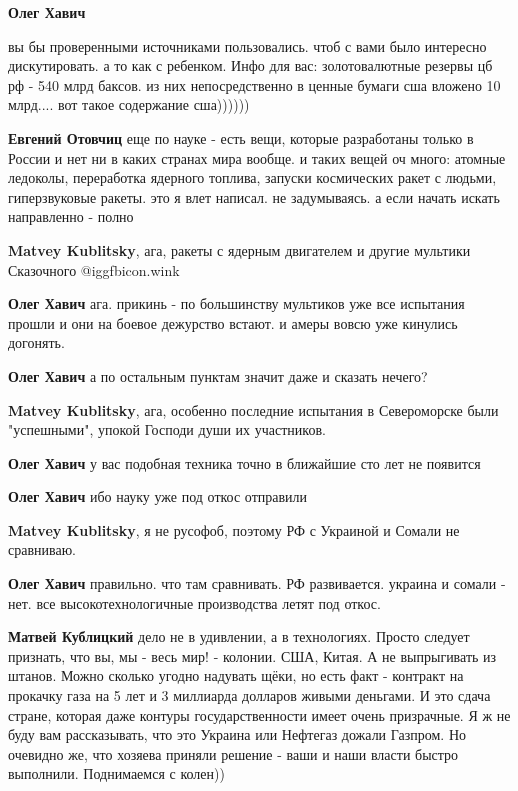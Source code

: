 \begin{itemize}
\begin{itemize}
\textbf{Олег Хавич} 

вы бы проверенными источниками пользовались. чтоб с вами было интересно
дискутировать. а то как с ребенком. Инфо для вас: золотовалютные резервы цб рф
- 540 млрд баксов. из них непосредственно в ценные бумаги сша вложено 10
млрд.... вот такое содержание сша))))))

\textbf{Евгений Отовчиц} еще по науке - есть вещи, которые разработаны только в России и нет ни в каких странах мира вообще. и таких вещей оч много: атомные ледоколы, переработка ядерного топлива, запуски космических ракет с людьми, гиперзвуковые ракеты. это я влет написал. не задумываясь. а если начать искать направленно - полно

\textbf{Matvey Kublitsky}, ага, ракеты с ядерным двигателем и другие мультики Сказочного  @igg{fbicon.wink} 

\textbf{Олег Хавич} ага. прикинь - по большинству мультиков уже все испытания прошли и они на боевое дежурство встают. и амеры вовсю уже кинулись догонять.

\textbf{Олег Хавич} а по остальным пунктам значит даже и сказать нечего?

\textbf{Matvey Kublitsky}, ага, особенно последние испытания в Североморске были "успешными", упокой Господи души их участников.

\textbf{Олег Хавич} у вас подобная техника точно в ближайшие сто лет не появится

\textbf{Олег Хавич} ибо науку уже под откос отправили

\textbf{Matvey Kublitsky}, я не русофоб, поэтому РФ с Украиной и Сомали не сравниваю.

\textbf{Олег Хавич} правильно. что там сравнивать. РФ развивается. украина и сомали - нет. все высокотехнологичные производства летят под откос.

\textbf{Матвей Кублицкий} дело не в удивлении, а в технологиях. Просто следует признать, что вы, мы - весь мир! - колонии. США, Китая.
А не выпрыгивать из штанов.
Можно сколько угодно надувать щёки, но есть факт - контракт на прокачку газа на 5 лет и 3 миллиарда долларов живыми деньгами. И это сдача стране, которая даже контуры государственности имеет очень призрачные.
Я ж не буду вам рассказывать, что это Украина или Нефтегаз дожали Газпром. Но очевидно же, что хозяева приняли решение - ваши и наши власти быстро выполнили.
Поднимаемся с колен))


\end{itemize}
\end{itemize}
